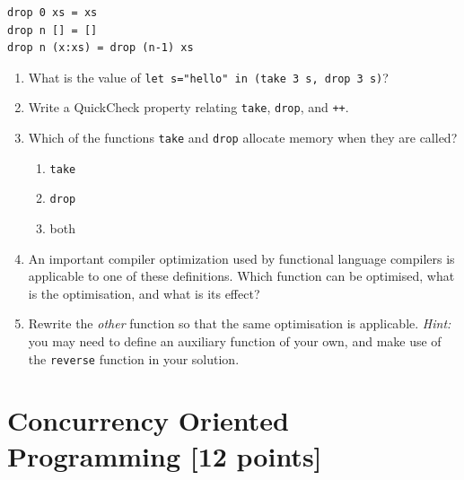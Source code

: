 \documentclass{article}
\begin{document}
\begin{enumerate}
\begin{verbatim}
drop 0 xs = xs
drop n [] = []
drop n (x:xs) = drop (n-1) xs
\end{verbatim}
\begin{enumerate}
\item
What is the value of \verb!let s="hello" in (take 3 s, drop 3 s)!?
\item
Write a QuickCheck property relating \verb!take!, \verb!drop!, and \verb!++!.
\item
Which of the functions \verb!take! and \verb!drop! allocate memory when they are called?
\begin{enumerate}
\item \verb!take!
\item \verb!drop!
\item both
\end{enumerate}
\item
An important compiler optimization used by functional language
compilers is applicable to one of these definitions. Which function
can be optimised, what is the optimisation, and what is its effect?
\item
Rewrite the {\em other} function so that the same optimisation is
applicable. {\em Hint:} you may need to define an auxiliary function
of your own, and make use of the \verb!reverse! function in your
solution.  
\end{enumerate}

\end{enumerate}


\newpage
\section{Concurrency Oriented Programming [12 points]}
\end{document}
